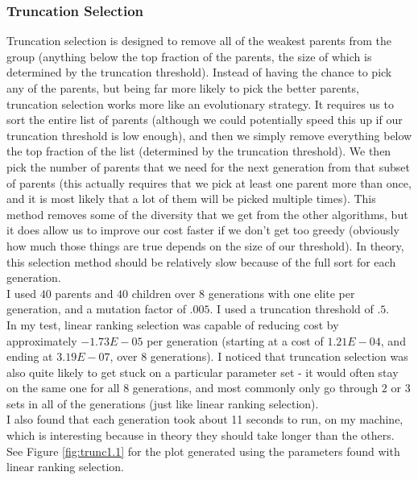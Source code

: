 \documentclass[]{article}
\begin{document}
	\subsubsection{Truncation Selection}
	Truncation selection is designed to remove all of the weakest parents from the group (anything below the top fraction of the parents, the size of which is determined by the truncation threshold). Instead of having the chance to pick any of the parents, but being far more likely to pick the better parents, truncation selection works more like an evolutionary strategy. It requires us to sort the entire list of parents (although we could potentially speed this up if our truncation threshold is low enough), and then we simply remove everything below the top fraction of the list (determined by the truncation threshold). We then pick the number of parents that we need for the next generation from that subset of parents (this actually requires that we pick at least one parent more than once, and it is most likely that a lot of them will be picked multiple times). This method removes some of the diversity that we get from the other algorithms, but it does allow us to improve our cost faster if we don't get too greedy (obviously how much those things are true depends on the size of our threshold). In theory, this selection method should be relatively slow because of the full sort for each generation. \\
	
	I used $40$ parents and $40$ children over $8$ generations with one elite per generation, and a mutation factor of $.005$. I used a truncation threshold of $.5$. \\ 
	
	In my test, linear ranking selection was capable of reducing cost by approximately $-1.73E-05$ per generation (starting at a cost of $1.21E-04$, and ending at $3.19E-07$, over $8$ generations). I noticed that truncation selection was also quite likely to get stuck on a particular parameter set - it would often stay on the same one for all $8$ generations, and most commonly only go through $2$ or $3$ sets in all of the generations (just like linear ranking selection). \\
	
	I also found that each generation took about 11 seconds to run, on my machine, which is interesting because in theory they should take longer than the others. \\
	
	See Figure \ref{fig:trunc1.1} for the plot generated using the parameters found with linear ranking selection.
	
\end{document}
